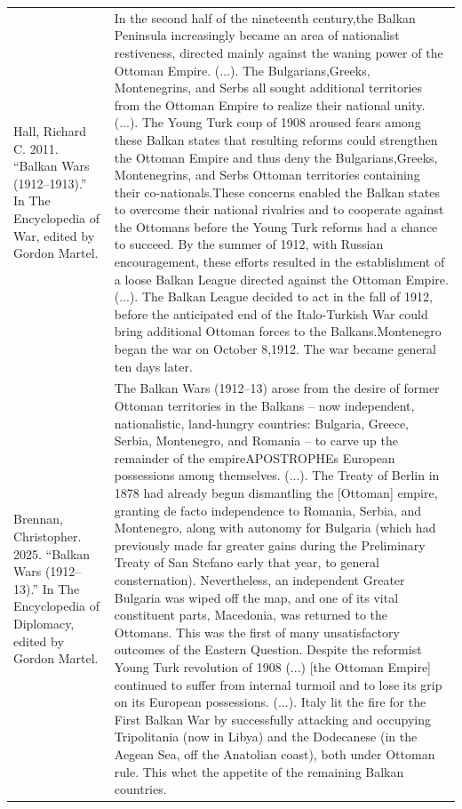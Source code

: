 {\begin{longtable}{p{}p{}}
\\
Hall, Richard C. 2011. “Balkan Wars (1912–1913).” In The Encyclopedia of War, edited by Gordon Martel. & In the second half of the nineteenth century,the Balkan Peninsula increasingly became an area of nationalist restiveness, directed mainly against the waning power of the Ottoman Empire. (...). 
The Bulgarians,Greeks, Montenegrins, and Serbs all sought additional territories from the Ottoman Empire to realize their national unity. (...). 
The Young Turk coup of 1908 aroused fears among these Balkan states that resulting reforms could strengthen the Ottoman Empire and thus deny the Bulgarians,Greeks, Montenegrins, and Serbs Ottoman territories containing their co-nationals.These concerns enabled the Balkan states to overcome their national rivalries and to cooperate against the Ottomans before the Young Turk reforms had a chance to succeed. By the summer of 1912, with Russian encouragement, these efforts resulted in the establishment of a loose Balkan League directed against the Ottoman Empire. (...).
The Balkan League decided to act in the fall of 1912, before the anticipated end of the Italo-Turkish War could bring additional Ottoman forces to the Balkans.Montenegro began the war on October 8,1912. The war became general ten days later.
\\
Brennan, Christopher. 2025. “Balkan Wars (1912–13).” In The Encyclopedia of Diplomacy, edited by Gordon Martel. & The Balkan Wars (1912–13) arose from the desire of former Ottoman territories in the Balkans – now independent, nationalistic, land-hungry countries: Bulgaria, Greece, Serbia, Montenegro, and Romania – to carve up the remainder of the empireAPOSTROPHEs European possessions among themselves. (...).
The Treaty of Berlin in 1878 had already begun dismantling the [Ottoman] empire, granting de facto independence to Romania, Serbia, and Montenegro, along with autonomy for Bulgaria (which had previously made far greater gains during the Preliminary Treaty of San Stefano early that year, to general consternation). Nevertheless, an independent Greater Bulgaria was wiped off the map, and one of its vital constituent parts, Macedonia, was returned to the Ottomans. This was the first of many unsatisfactory outcomes of the Eastern Question. Despite the reformist Young Turk revolution of 1908 (...) [the Ottoman Empire] continued to suffer from internal turmoil and to lose its grip on its European possessions. (...). Italy lit the fire for the First Balkan War by successfully attacking and occupying Tripolitania (now in Libya) and the Dodecanese (in the Aegean Sea, off the Anatolian coast), both under Ottoman rule. This whet the appetite of the remaining Balkan countries.

\end{longtable}}
